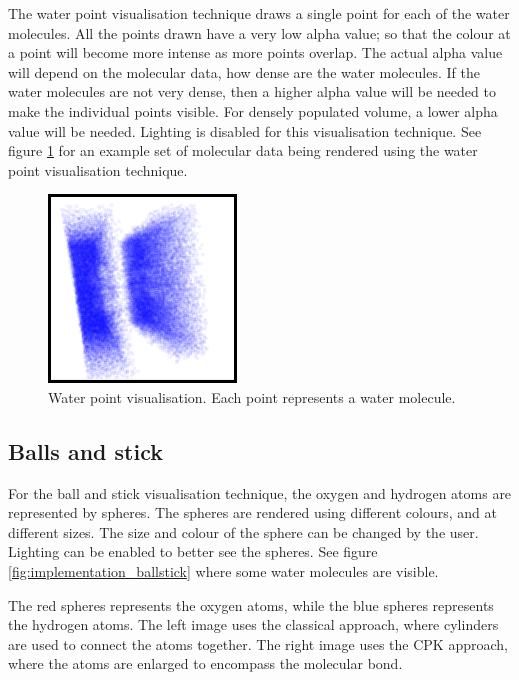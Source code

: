 The water point visualisation technique draws a single point for each of the
water molecules. All the points drawn have a very low alpha value; so that the
colour at a point will become more intense as more points overlap. The actual
alpha value will depend on the molecular data, how dense are the water
molecules. If the water molecules are not very dense, then a higher alpha value
will be needed to make the individual points visible. For densely populated
volume, a lower alpha value will be needed. Lighting is disabled for this
visualisation technique. See figure \ref{fig:implementation_waterpoint} for an
example set of molecular data being rendered using the water point
visualisation technique.

\begin{figure}[h!]
  \begin{center}
    \includegraphics[width=50mm]{waterpoint}
  \end{center}
  \caption{Water point visualisation. Each point represents a water molecule.}
  \label{fig:implementation_waterpoint}
\end{figure}


\subsection{Balls and stick}
\label{sub:implementation_ballstick}


For the ball and stick visualisation technique, the oxygen and hydrogen atoms
are represented by spheres. The spheres are rendered using different colours,
and at different sizes. The size and colour of the sphere can be changed by the
user. Lighting can be enabled to better see the spheres. See figure
\ref{fig:implementation_ballstick} where some water molecules are visible.

The red spheres represents the oxygen atoms, while the blue spheres represents
the hydrogen atoms. The left image uses the classical approach, where
cylinders are used to connect the atoms together. The right image uses the CPK
approach, where the atoms are enlarged to encompass the molecular bond.

